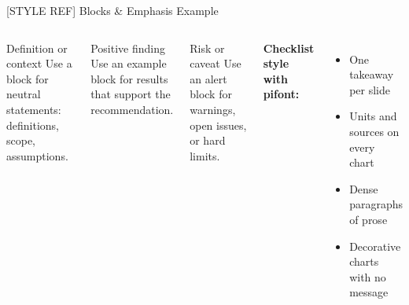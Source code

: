 \documentclass[aspectratio=169,10pt,t,xcolor=table]{beamer}
\begin{document}
\begin{frame}{[STYLE REF] Blocks \& Emphasis Example}
\small
\begin{columns}[T]
\begin{block}{Definition or context}
Use a block for neutral statements: definitions, scope, assumptions.
\end{block}
\begin{exampleblock}{Positive finding}
Use an example block for results that support the recommendation.
\end{exampleblock}
\begin{alertblock}{Risk or caveat}
Use an alert block for warnings, open issues, or hard limits.
\end{alertblock}

\textbf{Checklist style with pifont:}
\begin{itemize}
    \item[{\color{MediumGreen}\ding{51}}] One takeaway per slide
    \item[{\color{MediumGreen}\ding{51}}] Units and sources on every chart
    \item[{\color{MediumRed}\ding{55}}] Dense paragraphs of prose
    \item[{\color{MediumRed}\ding{55}}] Decorative charts with no message
\end{itemize}
\end{columns}
\end{frame}
\end{document}
